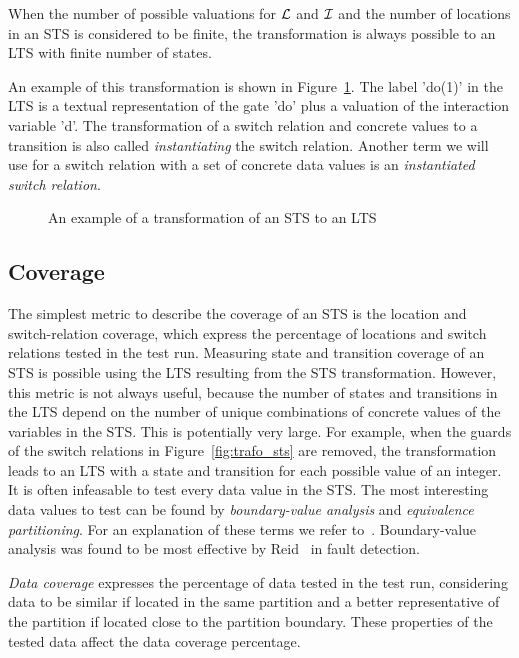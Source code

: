 When the number of possible valuations for $\mathcal{L}$ and $\mathcal{I}$ and the number of locations in an STS is considered to be finite, the transformation is always possible to an LTS with finite number of states.

An example of this transformation is shown in Figure~\ref{fig:example_trafo}. The label 'do(1)' in the LTS is a textual representation of the gate 'do' plus a valuation of the interaction variable 'd'. The transformation of a switch relation and concrete values to a transition is also called \textit{instantiating} the switch relation. Another term we will use for a switch relation with a set of concrete data values is an \textit{instantiated switch relation}.

\begin{figure}[ht]
  \begin{center}
    \hspace{20px}
  \end{center}
  \caption{An example of a transformation of an STS to an LTS}
  \label{fig:example_trafo}
\end{figure}

\subsection{Coverage}\label{sec:sts_coverage}
The simplest metric to describe the coverage of an STS is the location and switch-relation coverage, which express the percentage of locations and switch relations tested in the test run. Measuring state and transition coverage of an STS is possible using the LTS resulting from the STS transformation. However, this metric is not always useful, because the number of states and transitions in the LTS depend on the number of unique combinations of concrete values of the variables in the STS. This is potentially very large. For example, when the guards of the switch relations in Figure~\ref{fig:trafo_sts} are removed, the transformation leads to an LTS with a state and transition for each possible value of an integer. It is often infeasable to test every data value in the STS. The most interesting data values to test can be found by \textit{boundary-value analysis} and \textit{equivalence partitioning}. For an explanation of these terms we refer to~\cite{Myers:2004}. Boundary-value analysis was found to be most effective by Reid~\cite{Reid:partitioning} in fault detection.

\textit{Data coverage} expresses the percentage of data tested in the test run, considering data to be similar if located in the same partition and a better representative of the partition if located close to the partition boundary. These properties of the tested data affect the data coverage percentage.
